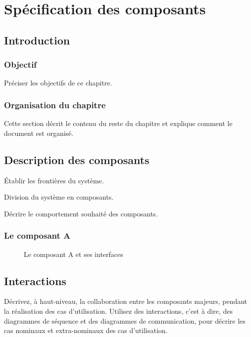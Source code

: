 
%
%
\chapter{Spécification des composants}\label{chapter:composants}

\section{Introduction}

	\subsection{Objectif}
Préciser les objectifs de ce chapitre. 

	\subsection{Organisation du chapitre}
Cette section décrit le contenu du reste du chapitre  et explique comment le document est organisé.
\section{Description des composants}

Établir les frontières du système.

Division du système en composants.

Décrire le comportement souhaité des composants.

\subsection{Le composant A}

\begin{figure}[htbp]
	\centering
	\caption{Le composant A et ses interfaces}
	\label{fig:label}
\end{figure}

\section{Interactions}

Décrivez, à haut-niveau, la collaboration entre les composants majeurs, pendant la réalisation des cas d'utilisation. 
Utilisez des interactions, c'est à dire, des diagrammes de séquence et des diagrammes de communication, pour décrire les cas nominaux et extra-nominaux des cas d'utilisation.


